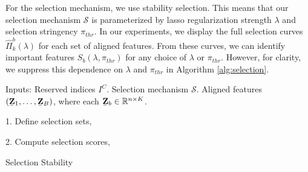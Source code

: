 For the selection mechanism, we use stability selection. This means that our
selection mechanism $\mathcal{S}$ is parameterized by lasso regularization
strength $\lambda$ and selection stringency $\pi_{thr}$. In our experiments, we
display the full selection curves $\hat{\Pi}^{b}_{k}\left(\lambda\right)$ for
each set of aligned features. From these curves, we can identify important
features $S_{b}\left(\lambda, \pi_{thr}\right)$ for any choice of $\lambda$ or
$\pi_{thr}$. However, for clarity, we suppress this dependence on $\lambda$ and
$\pi_{thr}$ in Algorithm \ref{alg:selection}.

\begin{algorithm}[H]
  \SetAlgoLined
  Inputs: Reserved indices $I^{C}$. Selection mechanism $\mathcal{S}$. Aligned
  features $\left(\underaccent{\bar}{\mathbf{Z}}_{1}, \dots,
  \underaccent{\bar}{\mathbf{Z}}_{B}\right)$, where each
  $\underaccent{\bar}{\mathbf{Z}}_{b} \in \reals^{n \times K}$.

  1. Define selection sets,


  2. Compute selection scores,

  \caption{Selection Stability}
  \label{alg:selection}
\end{algorithm}
